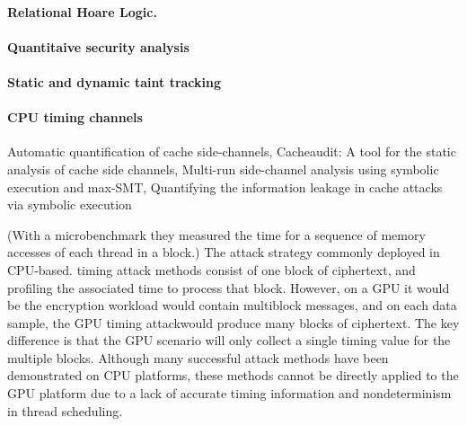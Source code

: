 


\paragraph{Relational Hoare Logic.}


\paragraph{Quantitaive security analysis}

\paragraph{Static and dynamic taint tracking}

\paragraph{CPU timing channels}
Automatic quantification of cache side-channels, Cacheaudit: A tool for the static analysis of cache side channels, Multi-run side-channel analysis using symbolic execution and max-SMT, Quantifying the information leakage in cache attacks via symbolic execution



(With a microbenchmark they measured the
time for a sequence of memory accesses of each thread in a block.)
%
The attack strategy commonly deployed in CPU-based. timing attack methods consist of one block of ciphertext, and profiling the associated time to process that
block. However, on a GPU it would be the encryption workload would contain multiblock messages, and on each data sample, the GPU
timing attackwould produce many blocks of ciphertext.
The key difference is that the GPU scenario will only
collect a single timing value for the multiple blocks.
Although many successful attack methods have been
demonstrated on CPU platforms, these methods cannot be directly applied to the GPU platform due to a
lack of accurate timing information and nondeterminism in thread scheduling.
